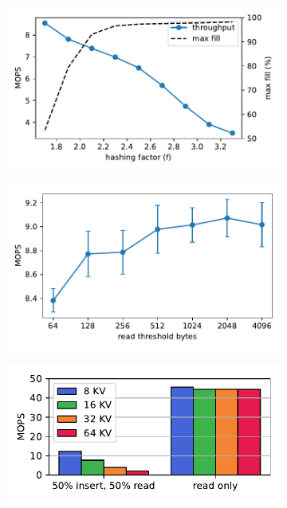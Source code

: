 \begin{figure}[t]
    \centering
    \begin{subfigure}{0.3\linewidth}
        \includegraphics[width=0.99\linewidth]{fig/factor.pdf}
    \end{subfigure}
    \begin{subfigure}{0.3\linewidth}
        \includegraphics[width=0.99\linewidth]{fig/read_size.pdf}
    \end{subfigure}
    \begin{subfigure}{0.3\linewidth}
      \includegraphics[width=0.99\linewidth]{fig/entry_size.pdf}
          \end{subfigure}


\end{figure}
